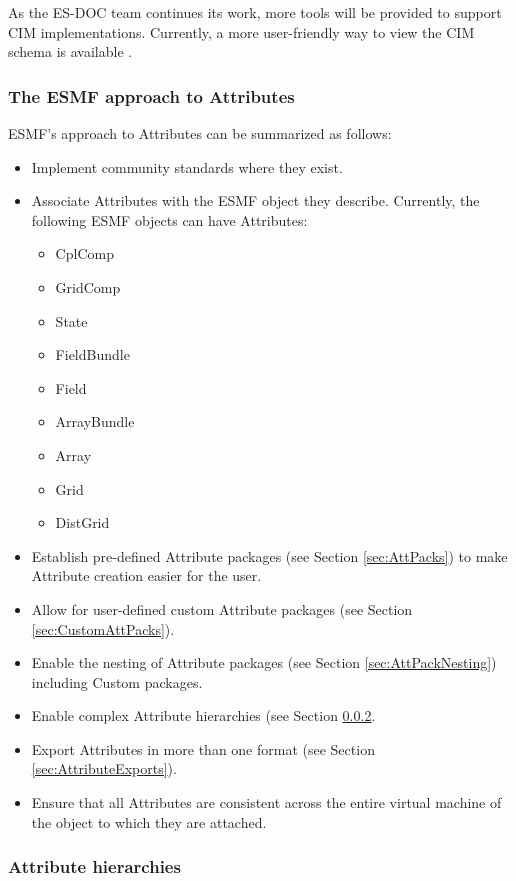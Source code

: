 As the ES-DOC team continues its work, more tools will be provided to support
CIM implementations.  Currently, a more user-friendly way to view the CIM
schema is available .


\subsubsection{The ESMF approach to Attributes}

ESMF's approach to Attributes can be summarized as follows:

\begin{itemize}
  \item Implement community standards where they exist.
  \item Associate Attributes with the ESMF object they describe. Currently, the following ESMF objects can have Attributes:
  \begin{itemize}
     \item CplComp
     \item GridComp
     \item State
     \item FieldBundle
     \item Field
     \item ArrayBundle
     \item Array
     \item Grid
     \item DistGrid
     \end{itemize}
  \item Establish pre-defined Attribute packages (see Section \ref{sec:AttPacks}) to make Attribute creation easier for the user.
  \item Allow for user-defined custom Attribute packages (see Section \ref{sec:CustomAttPacks}).
  \item Enable the nesting of Attribute packages (see Section \ref{sec:AttPackNesting}) including Custom packages.
  \item Enable complex Attribute hierarchies (see Section \ref{sec:AttHier}.
  \item Export Attributes in more than one format (see Section \ref{sec:AttributeExports}).
  \item Ensure that all Attributes are consistent across the entire virtual machine of the object to which they are attached.
\end{itemize}

\subsubsection{Attribute hierarchies}
\label{sec:AttHier}

